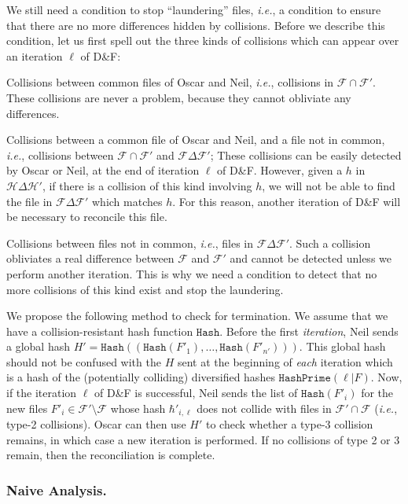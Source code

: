 \documentclass[twoside,envcountsame,runningheads]{llncs}
\newcommand{\Set}{\mathcal{H}}
\newcommand{\Files}{\mathcal{F}}
\newcommand{\df}{D\&F\xspace}
\newcommand{\ie}{\textit{i.e.}\xspace}
\newcommand{\Hash}{\ensuremath{\mathtt{Hash}}}
\newcommand{\HashPrime}{\ensuremath{\mathtt{HashPrime}}}
\begin{document}
We still need a condition to stop ``laundering'' files, \ie, a condition to ensure that there are no more differences hidden by collisions.
Before we describe this condition, let us first spell out the three kinds of collisions which can appear over an iteration $\ell$ of \df:

\begin{compactenum}
\item Collisions between common files of Oscar and Neil, \ie, collisions in $\Files \cap \Files'$. These collisions are never a problem, because they cannot obliviate any differences.
\item Collisions between a common file of Oscar and Neil, and a file not in common, \ie, collisions between $\Files \cap \Files'$ and $\Files \Delta \Files'$;
These collisions can be easily detected by Oscar or Neil, at the end of iteration $\ell$ of \df. 
However, given a $h$ in $\Set \Delta \Set'$, if there is a collision of this kind involving $h$, we will not be able to find the file in $\Files \Delta \Files'$ which matches $h$. For this reason, another iteration of \df will be necessary to reconcile this file.
\item Collisions between files not in common, \ie, files in $\Files \Delta \Files'$.
  Such a collision obliviates a real difference between $\Files$ and $\Files'$ and cannot be detected unless we perform another iteration. This is why we need a condition to detect that no more collisions of this kind exist and stop the laundering.
\end{compactenum}

We propose the following method to check for termination. We assume that we have a collision-resistant hash function $\Hash$.
Before the first \emph{iteration}, Neil sends a global hash $H' = \Hash((\Hash(F'_1),\dots,\Hash(F'_{n'})))$.
This global hash should not be confused with the $H$ sent at the beginning of \emph{each} iteration which is a hash of the (potentially colliding) diversified hashes $ \HashPrime(\ell|F)$.
Now, if the iteration $\ell$ of \df is successful, Neil sends the list of $\Hash(F'_i)$ for the new files $F'_i \in \Files' \setminus \Files$ whose hash $\hbar'_{i,\ell}$ does not collide with files in $\Files' \cap \Files$ (\ie, type-2 collisions).
Oscar can then use $H'$ to check whether a type-3 collision remains, in which case a new iteration is performed. If no collisions of type 2 or 3 remain, then the reconciliation is complete.

\subsubsection{Naive Analysis.}
\end{document}
